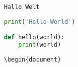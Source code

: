 \documentclass[12pt,ngerman]{scrartcl}
\begin{document}
\blindtext[2]


\begin{lstlisting}
Hallo Welt
\end{lstlisting}


\begin{lstlisting}[language={Python}]
print('Hello World')

def hello(world):
    print(world)
\end{lstlisting}


\begin{lstlisting}[language={[LaTeX]TeX}]
\begin{document}
\end{lstlisting}




\blindtext[3]
\end{document}
